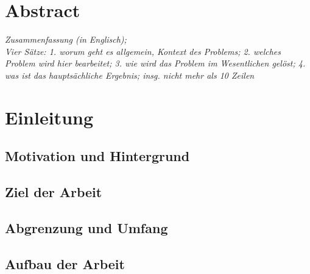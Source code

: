 \section*{Abstract}

\textit{Zusammenfassung (in Englisch); \\ Vier Sätze: 1. worum geht es allgemein, Kontext des Problems; 2. welches Problem wird hier bearbeitet; 3. wie wird das Problem im Wesentlichen gelöst; 4. was ist das hauptsächliche Ergebnis; insg. nicht mehr als 10 Zeilen}

\section{Einleitung}

\subsection{Motivation und Hintergrund}

\subsection{Ziel der Arbeit}

\subsection{Abgrenzung und Umfang}

\subsection{Aufbau der Arbeit}
